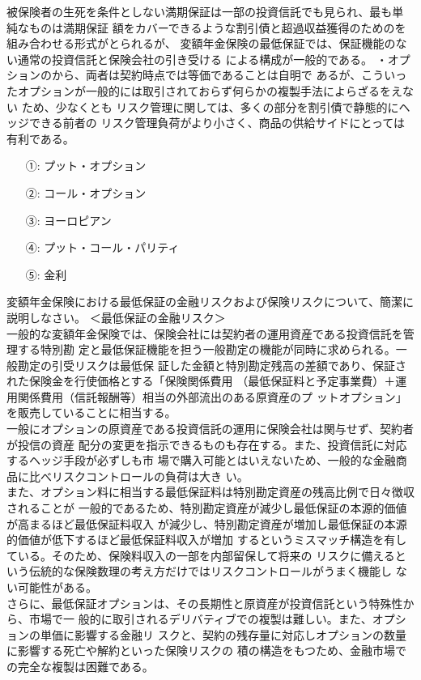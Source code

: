 \documentclass[report,gutter=10mm,fore-edge=10mm,uplatex,dvipdfmx]{jlreq}
\begin{document}
被保険者の生死を条件としない満期保証は一部の投資信託でも見られ、最も単純なものは満期保証
額をカバーできるような割引債と超過収益獲得のためのを組み合わせる形式がとられるが、
変額年金保険の最低保証では、保証機能のない通常の投資信託と保険会社の引き受ける
による構成が一般的である。
・オプションのから、両者は契約時点では等価であることは自明で
あるが、こういったオプションが一般的には取引されておらず何らかの複製手法によらざるをえない
ため、少なくとも
リスク管理に関しては、多くの部分を割引債で静態的にヘッジできる前者の
リスク管理負荷がより小さく、商品の供給サイドにとっては有利である。
\answer{}
\begin{itemize}
\item[①: ] プット・オプション
\item[②: ]コール・オプション
\item[③: ] ヨーロピアン
\item[④: ] プット・コール・パリティ
\item[⑤: ]金利
\end{itemize}

変額年金保険における最低保証の金融リスクおよび保険リスクについて、簡潔に説明しなさい。
\answer{}
＜最低保証の金融リスク＞\\
一般的な変額年金保険では、保険会社には契約者の運用資産である投資信託を管理する特別勘
定と最低保証機能を担う一般勘定の機能が同時に求められる。一般勘定の引受リスクは最低保
証した金額と特別勘定残高の差額であり、保証された保険金を行使価格とする「保険関係費用
（最低保証料と予定事業費）＋運用関係費用（信託報酬等）相当の外部流出のある原資産のプ
ットオプション」を販売していることに相当する。\\
一般にオプションの原資産である投資信託の運用に保険会社は関与せず、契約者が投信の資産
配分の変更を指示できるものも存在する。また、投資信託に対応するヘッジ手段が必ずしも市
場で購入可能とはいえないため、一般的な金融商品に比べリスクコントロールの負荷は大き
い。\\
また、オプション料に相当する最低保証料は特別勘定資産の残高比例で日々徴収されることが
一般的であるため、特別勘定資産が減少し最低保証の本源的価値が高まるほど最低保証料収入
が減少し、特別勘定資産が増加し最低保証の本源的価値が低下するほど最低保証料収入が増加
するというミスマッチ構造を有している。そのため、保険料収入の一部を内部留保して将来の
リスクに備えるという伝統的な保険数理の考え方だけではリスクコントロールがうまく機能し
ない可能性がある。\\
さらに、最低保証オプションは、その長期性と原資産が投資信託という特殊性から、市場で一
般的に取引されるデリバティブでの複製は難しい。また、オプションの単価に影響する金融リ
スクと、契約の残存量に対応しオプションの数量に影響する死亡や解約といった保険リスクの
積の構造をもつため、金融市場での完全な複製は困難である。
\end{document}
